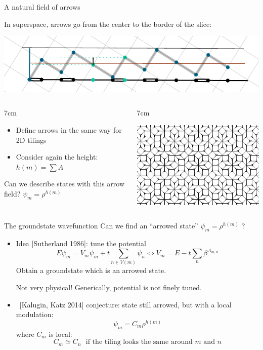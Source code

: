 \documentclass[xcolor=x11names,compress,professionalfonts, aspectratio=169]{beamer}
\renewcommand{\(}{\begin{columns}}
\renewcommand{\)}{\end{columns}}
\newcommand{\<}[1]{\begin{column}{#1}}
\renewcommand{\>}{\end{column}}
\begin{document}
\begin{frame}{A natural field of arrows}

In superspace, arrows go from the center to the border of the slice:

{\centering
\includegraphics[scale=.8]{img/cut_and_project_arrows.pdf}

}

\begin{columns}
\<{7cm}
\begin{itemize}
	\item Define arrows in the same way for 2D tilings
	\item Consider again the height: $h(m) = \sum A$
\end{itemize}
	Can we describe states with this arrow field? $\psi_m = \rho^{h(m)}$
\>
\<{7cm}
{\centering
\includegraphics[scale=.9]{img/arrowed_tiling_excerpt.pdf}

}
\>
\end{columns}

\end{frame}

\begin{frame}{The groundstate wavefunction}
Can we find an ``arrowed state'' $\psi_m = \rho^{h(m)}$ ?
\begin{itemize}
\item Idea [Sutherland 1986]: tune the potential
\[
	E \psi_m = V_m \psi_m + t \sum_{n \in V(m)} \psi_n \Longleftrightarrow V_m = E - t\sum_n \beta^{A_{m,n}}
\]
Obtain a groundstate which is an arrowed state.

Not very physical! Generically, potential is not finely tuned.

\item ~[Kalugin, Katz 2014] conjecture: state still arrowed, but with a local modulation:
\[
	\psi_m = C_{m} \rho^{h(m)}
\]
where $C_m$ is local:
\[
	C_m \simeq C_n \text{~ if the tiling looks the same around $m$ and $n$}
\]
\end{itemize}
\end{frame}
\end{document}

